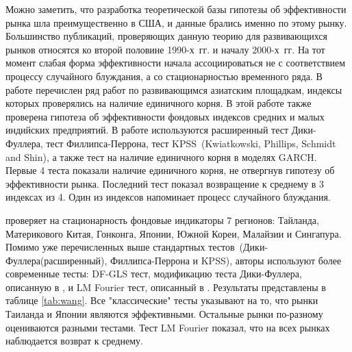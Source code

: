 \documentclass[a4paper,12pt]{article}
\begin{document}
Можно заметить, что разработка теоретической базы гипотезы об эффективности рынка шла преимущественно в США, и данные брались именно по этому рынку. Большинство публикаций, проверяющих данную теорию для развивающихся рынков относятся ко второй половине 1990-х~гг. и началу 2000-х~гг. На тот момент слабая форма эффективности начала ассоциироваться не с соответствием процессу случайного блуждания, а со стационарностью временного ряда. В работе \cite{Mishra2017} перечислен ряд работ по развивающимся азиатским площадкам, индексы которых проверялись на наличие единичного корня. В этой работе также проверена гипотеза об эффективности фондовых индексов средних и малых индийских предприятий. В работе используются расширенный тест Дики-Фуллера, тест Филлипса-Перрона, тест KPSS~(Kwiatkowski, Phillips, Schmidt and Shin), а также тест на наличие единичного корня в моделях GARCH. Первые 4 теста показали наличие единичного корня, не отвергнув гипотезу об эффективности рынка. Последний тест показал возвращение к среднему в 3 индексах из 4. Один из индексов напоминает процесс случайного блуждания.

\cite{Wang2015} проверяет на стационарность фондовые индикаторы 7 регионов: Тайланда, Материкового Китая, Гонконга, Японии, Южной Кореи, Малайзии и Сингапура. Помимо уже перечисленных выше стандартных тестов~(Дики-Фуллера(расширенный), Филлипса-Перрона и KPSS), авторы используют более современные тесты: DF-GLS тест, модификацию теста Дики-Фуллера, описанную в \cite{Elliot1996}, и LM Fourier тест, описанный в \cite{Enders2012}. Результаты представлены в таблице \ref{tab:wang}. Все "классические" тесты указывают на то, что рынки Таиланда и Японии являются эффективными. Остальные рынки по-разному оцениваются разными тестами. Тест LM Fourier показал, что на всех рынках наблюдается возврат к среднему.
\end{document}
